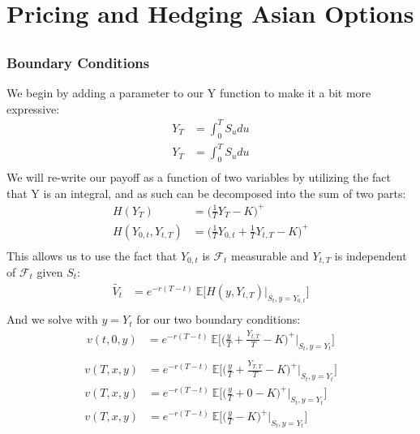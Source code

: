 \documentclass[a4paper,12pt]{article}
\begin{document}
\section{Pricing and Hedging Asian Options}



\subsection{}

\subsubsection{}

\subsubsection{Boundary Conditions}
We begin by adding a parameter to our Y function to make it a bit more expressive:
\begin{align*}
Y_{T} &= \int_0^T S_udu \\
Y_{T} &= \int_0^T S_udu \\
\end{align*}
We will re-write our payoff as a function of two variables by utilizing the fact that Y is an integral, and as such can be decomposed into the sum of two parts:
\begin{align*}
H(Y_T) &= \bigg( \frac{1}{T}Y_T - K \bigg)^+ \\
H(Y_{0,t}, Y_{t,T}) &= \bigg( \frac{1}{T}Y_{0,t} +  \frac{1}{T}Y_{t,T} - K \bigg)^+ \\
\end{align*}
This allows us to use the fact that $Y_{0,t}$ is $\mathcal{F}_t$ measurable and $Y_{t,T}$ is independent of $\mathcal{F}_t$ given $S_t$:
\begin{align*}
\tilde{V_t} &= e^{-r(T-t)} \ \mathbb{E} \big[ H (y, Y_{t, T}) | _{S_t, y = Y_{0,t}} \big] \\
\end{align*}
And we solve with $y = Y_t$ for our two boundary conditions:
\begin{align*}
v(t, 0, y) &= e^{-r(T-t)} \ \mathbb{E} \big[ \bigg( \frac{y}{T} +  \frac{Y_{t,T}}{T} - K \bigg)^+ | _{S_t, y = Y_t} \big] \\
\end{align*}
\begin{align*}
v(T, x, y) &= e^{-r(T-t)} \ \mathbb{E} \big[ \bigg( \frac{y}{T} +  \frac{Y_{T,T}}{T} - K \bigg)^+ | _{S_t, y = Y_t} \big] \\
v(T, x, y) &= e^{-r(T-t)} \ \mathbb{E} \big[ \bigg( \frac{y}{T} +  0 - K \bigg)^+ | _{S_t, y = Y_t} \big] \\
v(T, x, y) &= e^{-r(T-t)} \ \mathbb{E} \big[ \bigg( \frac{y}{T} - K \bigg)^+ | _{S_t, y = Y_t} \big] \\
\end{align*}
\end{document}
